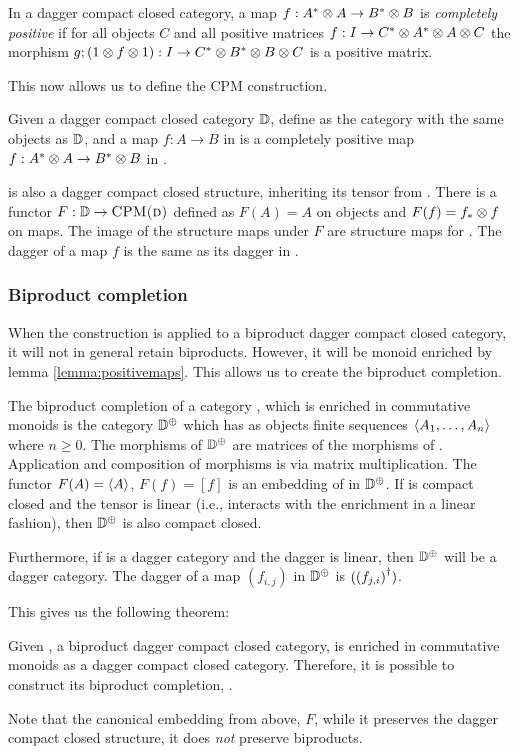 \begin{definition}\label{def:completelypositive}
  In a dagger compact closed category, a map $f:A^{*}\otimes A \to B^{*}\otimes B$ is \emph{completely positive}
  if for all objects $C$ and all positive matrices $f: I \to C^{*} \otimes A^{*} \otimes A \otimes C$ the morphism
  $g ; (1\otimes f\otimes1):I \to C^{*} \otimes B^{*}\otimes B \otimes C$ is a positive matrix.
\end{definition}

This now allows us to define the CPM construction.

\begin{definition}\label{def:cpmconstruction}
  Given a dagger compact closed category $\mathbb{D}$, define  as the category with the
  same objects as $\mathbb{D}$, and a map $f:A\to B$ in  is a completely positive map
  $f:A^{*}\otimes A \to B^{*}\otimes B$ in \cD.
\end{definition}

 is also a dagger compact closed structure, inheriting its tensor from \cD.
There is a functor $F:\mathbb{D} \to \textsc{CPM(d)}$ defined as $F(A) = A$ on objects and $F(f)=
f_{*}\otimes f$ on maps. The image of the structure maps under $F$ are structure maps for
. The dagger of a map $f$ is the same as its dagger in \cD.

\subsubsection{Biproduct completion}\label{sec:biproduct}
When the  construction is applied to a biproduct dagger compact closed category, it
will not in general retain biproducts. However, it will be monoid enriched by lemma
\ref{lemma:positivemaps}. This allows us to create the biproduct completion.

The biproduct completion of a category \cD, which is enriched in commutative monoids is the
category $\mathbb{D}^{\oplus}$ which has as objects finite sequences $\langle A_{1},\ldots,A_{n}\rangle$ where $n\ge 0$.
The morphisms of $\mathbb{D}^{\oplus}$ are matrices of the morphisms of \cD. Application and composition of
morphisms is via matrix multiplication. The functor $F(A) = \langle A\rangle$, $F(f)=[f]$ is an embedding of
\cD{} in $\mathbb{D}^{\oplus}$. If \cD{} is compact closed and the tensor is linear (i.e., interacts with the
enrichment in a linear fashion), then $\mathbb{D}^{\oplus}$ is also compact closed.

Furthermore, if \cD{} is a dagger category and the dagger is linear, then $\mathbb{D}^{\oplus}$ will be a
dagger category. The dagger of a map $(f_{i,j})$ in $\mathbb{D}^{\oplus}$ is $({(f_{j,i})}^{\dagger})$.

This gives us the following theorem:

\begin{theorem}\label{theorem:biproductcompletion}
Given \cD, a biproduct dagger compact closed category,  is enriched in commutative monoids
as a dagger compact closed category. Therefore, it is possible to construct its biproduct
completion, .
\end{theorem}

Note that the canonical embedding from above, $F$, while it preserves the dagger compact closed
structure, it does \emph{not} preserve biproducts.
